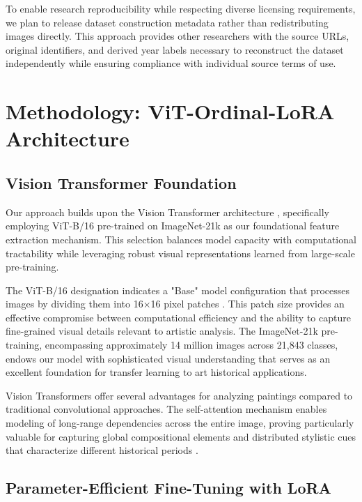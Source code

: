 \documentclass[10pt,twocolumn,letterpaper]{article}
\begin{document}
To enable research reproducibility while respecting diverse licensing requirements, we plan to release dataset construction metadata rather than redistributing images directly. This approach provides other researchers with the source URLs, original identifiers, and derived year labels necessary to reconstruct the dataset independently while ensuring compliance with individual source terms of use.

\section{Methodology: ViT-Ordinal-LoRA Architecture}

\subsection{Vision Transformer Foundation}

Our approach builds upon the Vision Transformer architecture \cite{Dosovitskiy20ViT}, specifically employing ViT-B/16 pre-trained on ImageNet-21k as our foundational feature extraction mechanism. This selection balances model capacity with computational tractability while leveraging robust visual representations learned from large-scale pre-training.

The ViT-B/16 designation indicates a "Base" model configuration that processes images by dividing them into 16×16 pixel patches \cite{Dosovitskiy20ViT}. This patch size provides an effective compromise between computational efficiency and the ability to capture fine-grained visual details relevant to artistic analysis. The ImageNet-21k pre-training, encompassing approximately 14 million images across 21,843 classes, endows our model with sophisticated visual understanding that serves as an excellent foundation for transfer learning to art historical applications.

Vision Transformers offer several advantages for analyzing paintings compared to traditional convolutional approaches. The self-attention mechanism enables modeling of long-range dependencies across the entire image, proving particularly valuable for capturing global compositional elements and distributed stylistic cues that characterize different historical periods \cite{Dosovitskiy20ViT}.

\subsection{Parameter-Efficient Fine-Tuning with LoRA}
\end{document}
